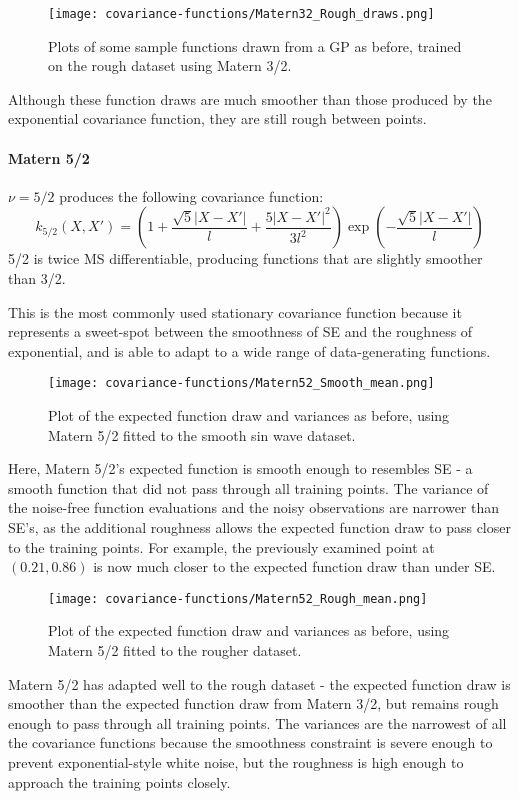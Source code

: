 \begin{figure}[H]
    \texttt{[image: covariance-functions/Matern32\_Rough\_draws.png]}
    \caption{
        Plots of some sample functions drawn from a GP as before, trained on the rough dataset using Matern 3/2.
    }
\end{figure}
Although these function draws are much smoother than those produced by the exponential covariance function, they are still rough between points.


\paragraph{Matern 5/2}
$\nu = 5/2$ produces the following covariance function:
\begin{equation*}
    k_{5/2}(X,X') = \left(1 + \frac{\sqrt{5}|X - X'|}{l} + \frac{5|X - X'|^2}{3l^2} \right) \exp \left(-\frac{\sqrt{5}|X - X'|}{l} \right)
\end{equation*}
5/2 is twice MS differentiable, producing functions that are slightly smoother than 3/2. 

This is the most commonly used stationary covariance function \cite{gaupro} because it represents a sweet-spot between the smoothness of SE and the roughness of exponential, and is able to adapt to a wide range of data-generating functions.

\begin{figure}[H]
    \texttt{[image: covariance-functions/Matern52\_Smooth\_mean.png]}
    \caption{
        Plot of the expected function draw and variances as before, using Matern 5/2 fitted to the smooth sin wave dataset. 
    }
\end{figure}
Here, Matern 5/2's expected function is smooth enough to resembles SE - a smooth function that did not pass through all training points. The variance of the noise-free function evaluations and the noisy observations are narrower than SE's, as the additional roughness allows the expected function draw to pass closer to the training points. For example, the previously examined point at $(0.21, 0.86)$ is now much closer to the expected function draw than under SE.

\begin{figure}[H]
    \texttt{[image: covariance-functions/Matern52\_Rough\_mean.png]}
    \caption{
        Plot of the expected function draw and variances as before, using Matern 5/2 fitted to the rougher dataset. \\ 
    }
\end{figure}
Matern 5/2 has adapted well to the rough dataset - the expected function draw is smoother than the expected function draw from Matern 3/2, but remains rough enough to pass through all training points. The variances are the narrowest of all the covariance functions because the smoothness constraint is severe enough to prevent exponential-style white noise, but the roughness is high enough to approach the training points closely. 

